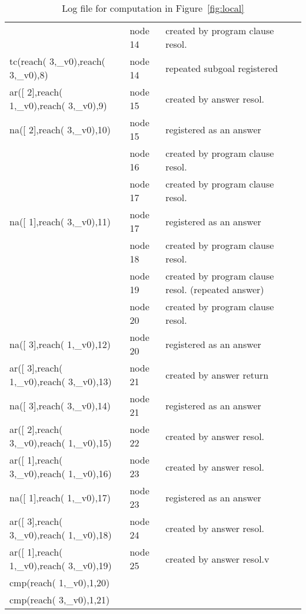 \begin{example}
\begin{table}[htbp]
\begin{tabular}{lll}
                                             & node 14 & created by program clause resol. \\
tc(reach( 3,\_v0),reach( 3,\_v0),8)         & node 14 & repeated subgoal registered \\
ar([ 2],reach( 1,\_v0),reach( 3,\_v0),9)      & node 15 & created by answer resol. \\
na([ 2],reach( 3,\_v0),10)                  & node 15 & registered as an answer \\
                                             & node 16 & created by program clause resol. \\
                                             & node 17 & created by program clause resol. \\
na([ 1],reach( 3,\_v0),11)                   & node 17 & registered as an answer \\
                                             & node 18 & created by program clause resol. \\
                                             & node 19 & created by program clause resol. (repeated answer)\\
                                             & node 20 & created by program clause resol.\\
na([ 3],reach( 1,\_v0),12)                   & node 20 & registered as an answer\\
ar([ 3],reach( 1,\_v0),reach( 3,\_v0),13)     & node 21 & created by answer return\\
na([ 3],reach( 3,\_v0),14)                   & node 21 & registered as an answer\\
ar([ 2],reach( 3,\_v0),reach( 1,\_v0),15)     & node 22 & created by answer resol.\\
ar([ 1],reach( 3,\_v0),reach( 1,\_v0),16)     & node 23 & created by answer resol.\\
na([ 1],reach( 1,\_v0),17)                   & node 23 & registered as an answer \\
ar([ 3],reach( 3,\_v0),reach( 1,\_v0),18)     & node 24 & created by answer resol. \\
ar([ 1],reach( 1,\_v0),reach( 3,\_v0),19)     & node 25 & created by answer resol.v \\
cmp(reach( 1,\_v0),1,20)                     &  & \\
cmp(reach( 3,\_v0),1,21)   & & \\ \hline
\end{tabular}
\caption{Log file for computation in Figure~\ref{fig:local}}\label{tab:fview}
\end{table}
\end{example}

